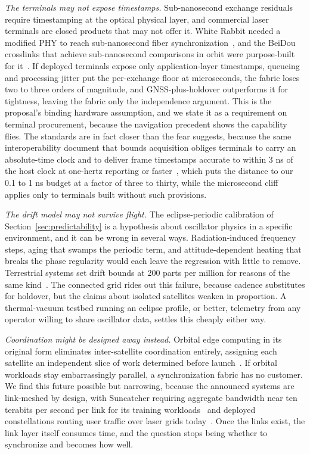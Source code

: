 \documentclass[twocolumn,10pt]{article}
\newcommand{\runin}[1]{\smallskip\noindent\textit{#1.}\hspace{0.6em}}
\begin{document}
\runin{The terminals may not expose timestamps}
Sub-nanosecond exchange residuals require timestamping at the optical physical layer, and commercial laser terminals are closed products that may not offer it. White Rabbit needed a modified PHY to reach sub-nanosecond fiber synchronization~\cite{whiterabbit}, and the BeiDou crosslinks that achieve sub-nanosecond comparisons in orbit were purpose-built for it~\cite{li2025}. If deployed terminals expose only application-layer timestamps, queueing and processing jitter put the per-exchange floor at microseconds, the fabric loses two to three orders of magnitude, and GNSS-plus-holdover outperforms it for tightness, leaving the fabric only the independence argument. This is the proposal's binding hardware assumption, and we state it as a requirement on terminal procurement, because the navigation precedent shows the capability flies. The standards are in fact closer than the fear suggests, because the same interoperability document that bounds acquisition obliges terminals to carry an absolute-time clock and to deliver frame timestamps accurate to within 3 ns of the host clock at one-hertz reporting or faster~\cite{sdaoct}, which puts the distance to our 0.1 to 1 ns budget at a factor of three to thirty, while the microsecond cliff applies only to terminals built without such provisions.

\runin{The drift model may not survive flight}
The eclipse-periodic calibration of Section~\ref{sec:predictability} is a hypothesis about oscillator physics in a specific environment, and it can be wrong in several ways. Radiation-induced frequency steps, aging that swamps the periodic term, and attitude-dependent heating that breaks the phase regularity would each leave the regression with little to remove. Terrestrial systems set drift bounds at 200 parts per million for reasons of the same kind~\cite{corbett2012,li2020}. The connected grid rides out this failure, because cadence substitutes for holdover, but the claims about isolated satellites weaken in proportion. A thermal-vacuum testbed running an eclipse profile, or better, telemetry from any operator willing to share oscillator data, settles this cheaply either way.

\runin{Coordination might be designed away instead}
Orbital edge computing in its original form eliminates inter-satellite coordination entirely, assigning each satellite an independent slice of work determined before launch~\cite{denby2020}. If orbital workloads stay embarrassingly parallel, a synchronization fabric has no customer. We find this future possible but narrowing, because the announced systems are link-meshed by design, with Suncatcher requiring aggregate bandwidth near ten terabits per second per link for its training workloads~\cite{suncatcher2025} and deployed constellations routing user traffic over laser grids today~\cite{brashears2024}. Once the links exist, the link layer itself consumes time, and the question stops being whether to synchronize and becomes how well.
\end{document}
